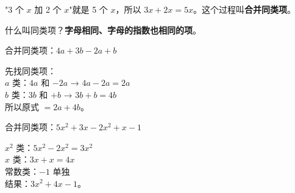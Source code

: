 "3 个 $x$ 加 2 个 $x$"就是 5 个 $x$，所以 $3x + 2x = 5x$。这个过程叫\textbf{合并同类项}。

什么叫同类项？\textbf{字母相同、字母的指数也相同的项}。

\begin{example}
合并同类项：$4a + 3b - 2a + b$
\end{example}
\begin{solution}
先找同类项：\\
$a$ 类：$4a$ 和 $-2a$ → $4a-2a = 2a$\\
$b$ 类：$3b$ 和 $+b$ → $3b+b = 4b$\\
所以原式 $= 2a + 4b$。
\end{solution}

\begin{example}
合并同类项：$5x^2 + 3x - 2x^2 + x - 1$
\end{example}
\begin{solution}
$x^2$ 类：$5x^2 - 2x^2 = 3x^2$\\
$x$ 类：$3x + x = 4x$\\
常数类：$-1$ 单独\\
结果：$3x^2 + 4x - 1$。
\end{solution}

